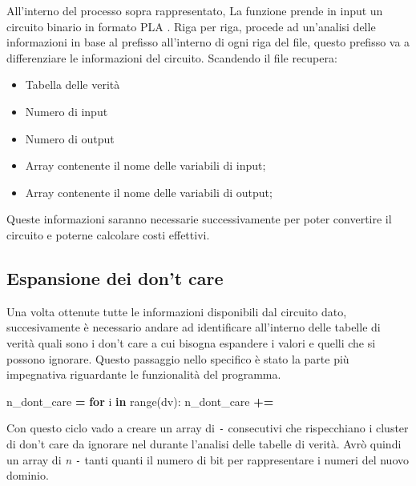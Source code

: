\documentclass[
]{book}
\newenvironment{Shaded}{\begin{snugshade}}{\end{snugshade}}
\newcommand{\BuiltInTok}[1]{#1}
\newcommand{\ControlFlowTok}[1]{\textcolor[rgb]{0.13,0.29,0.53}{\textbf{#1}}}
\newcommand{\KeywordTok}[1]{\textcolor[rgb]{0.13,0.29,0.53}{\textbf{#1}}}
\newcommand{\NormalTok}[1]{#1}
\newcommand{\OperatorTok}[1]{\textcolor[rgb]{0.81,0.36,0.00}{\textbf{#1}}}
\newcommand{\StringTok}[1]{\textcolor[rgb]{0.31,0.60,0.02}{#1}}
\providecommand{\tightlist}{%
  \setlength{\itemsep}{0pt}\setlength{\parskip}{0pt}}
\begin{document}
All'interno del processo sopra rappresentato, La funzione prende in input un circuito binario in formato PLA . Riga per riga, procede ad un'analisi delle informazioni in base al prefisso all'interno di ogni riga del file, questo prefisso va a differenziare le informazioni del circuito. Scandendo il file recupera:

\begin{itemize}
\tightlist
\item
  Tabella delle verità
\item
  Numero di input
\item
  Numero di output
\item
  Array contenente il nome delle variabili di input;
\item
  Array contenente il nome delle variabili di output;
\end{itemize}

Queste informazioni saranno necessarie successivamente per poter convertire il circuito e poterne calcolare costi effettivi.

\newpage

\hypertarget{espansione-dei-dont-care}{%
\subsection{Espansione dei don't care}\label{espansione-dei-dont-care}}

Una volta ottenute tutte le informazioni disponibili dal circuito dato, succesivamente è necessario andare ad identificare all'interno delle tabelle di verità quali sono i don't care a cui bisogna espandere i valori e quelli che si possono ignorare. Questo passaggio nello specifico è stato la parte più impegnativa riguardante le funzionalità del programma.

\begin{Shaded}
\begin{Highlighting}[]
\NormalTok{n\_dont\_care }\OperatorTok{=} \StringTok{\textquotesingle{}\textquotesingle{}}
  \ControlFlowTok{for}\NormalTok{ i }\KeywordTok{in} \BuiltInTok{range}\NormalTok{(dv):}
\NormalTok{    n\_dont\_care }\OperatorTok{+=} \StringTok{\textquotesingle{}{-}\textquotesingle{}}
\end{Highlighting}
\end{Shaded}

Con questo ciclo vado a creare un array di \texttt{-} consecutivi che rispecchiano i cluster di don't care da ignorare nel durante l'analisi delle tabelle di verità. Avrò quindi un array di \emph{n} \texttt{-} tanti quanti il numero di bit per rappresentare i numeri del nuovo dominio.
\end{document}
